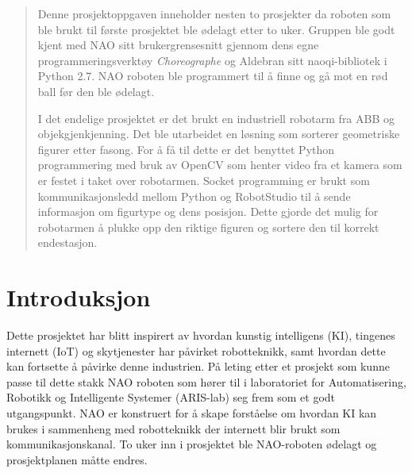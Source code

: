 \documentclass[conference]{IEEEtran}
\begin{document}
\begin{abstract}
    Denne prosjektoppgaven inneholder nesten to prosjekter da roboten som ble brukt til første prosjektet ble ødelagt etter to uker. 
    Gruppen ble godt kjent med NAO sitt brukergrensesnitt gjennom dens egne programmeringsverktøy \textit{Choreographe} og Aldebran sitt 
    naoqi-bibliotek i Python 2.7. NAO roboten ble programmert til å finne og gå mot en rød ball før den ble ødelagt. 

    I det endelige prosjektet er det brukt en industriell robotarm fra ABB og objekgjenkjenning. 
    Det ble utarbeidet en løsning som sorterer geometriske figurer etter fasong. For å få til dette 
    er det benyttet Python programmering med bruk av OpenCV som henter video fra et kamera som er 
    festet i taket over robotarmen. Socket programming er brukt som kommunikasjonsledd mellom Python 
    og RobotStudio til å sende informasjon om figurtype og dens posisjon. Dette gjorde det mulig for 
    robotarmen å plukke opp den riktige figuren og sortere den til korrekt endestasjon. 
\end{abstract}





%
\IEEEpeerreviewmaketitle



\section{Introduksjon}
Dette prosjektet har blitt inspirert av hvordan kunstig intelligens (KI), tingenes internett (IoT) og skytjenester har påvirket robotteknikk, 
samt hvordan dette kan fortsette å påvirke denne industrien. På leting etter et prosjekt som kunne passe til dette stakk NAO roboten som hører
til i laboratoriet for Automatisering, Robotikk og Intelligente Systemer (ARIS-lab) seg frem som et godt utgangspunkt. NAO er konstruert for å 
skape forståelse om hvordan KI kan brukes i sammenheng med robotteknikk der internett blir brukt som kommunikasjonskanal. To uker inn i prosjektet 
ble NAO-roboten ødelagt og prosjektplanen måtte endres. 
\end{document}
